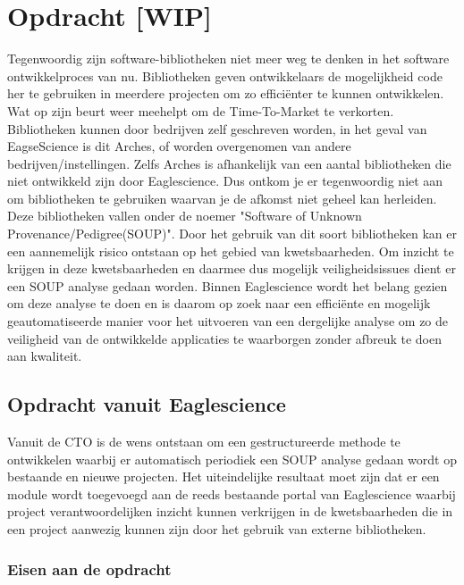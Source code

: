 
\chapter{Opdracht [WIP]} %
\label{ch:opdracht} %
Tegenwoordig zijn software-bibliotheken niet meer weg te denken in het software ontwikkelproces van nu. Bibliotheken geven ontwikkelaars de mogelijkheid code her te gebruiken in meerdere projecten om zo effici\"enter te kunnen ontwikkelen. Wat op zijn beurt weer meehelpt om de Time-To-Market te verkorten. Bibliotheken kunnen door bedrijven zelf geschreven worden, in het geval van EagseScience is dit Arches, of worden overgenomen van andere bedrijven/instellingen. Zelfs Arches is afhankelijk van een aantal bibliotheken die niet ontwikkeld zijn door Eaglescience. Dus ontkom je er tegenwoordig niet aan om bibliotheken te gebruiken waarvan je de afkomst niet geheel kan herleiden.\\
Deze bibliotheken vallen onder de noemer "Software of Unknown Provenance/Pedigree(SOUP)". Door het gebruik van dit soort bibliotheken kan er een aannemelijk risico ontstaan op het gebied van kwetsbaarheden. Om inzicht te krijgen in deze kwetsbaarheden en daarmee dus mogelijk veiligheidsissues dient er een SOUP analyse gedaan worden. Binnen Eaglescience wordt het belang gezien om deze analyse te doen en is daarom op zoek naar een efficiënte en mogelijk geautomatiseerde manier voor het uitvoeren van een dergelijke analyse om zo de veiligheid van de ontwikkelde applicaties te waarborgen zonder afbreuk te doen aan kwaliteit. 


\section{Opdracht vanuit Eaglescience}
Vanuit de CTO is de wens ontstaan om een gestructureerde methode te ontwikkelen waarbij er automatisch periodiek een SOUP analyse gedaan wordt op bestaande en nieuwe projecten. Het uiteindelijke resultaat moet zijn dat er een module wordt toegevoegd aan de reeds bestaande portal van Eaglescience waarbij project verantwoordelijken inzicht kunnen verkrijgen in de kwetsbaarheden die in een project aanwezig kunnen zijn door het gebruik van externe bibliotheken.

\subsection{Eisen aan de opdracht}


